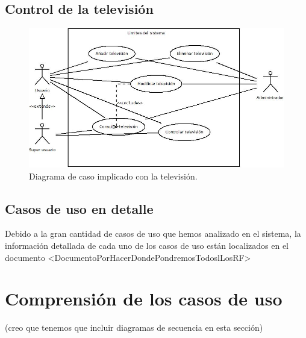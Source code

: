 \subsection{Control de la televisi\'on}
\begin{figure}
	\centering
	\includegraphics[scale=0.5]{4.Disenio/Imagenes/CasoDeUsoTelevision}
	\caption{Diagrama de caso implicado con la televisi\'on.}
\end{figure}
\subsection{Casos de uso en detalle}
Debido a la gran cantidad de casos de uso que hemos analizado en el sistema, la informaci\'on detallada de cada uno de los casos de uso est\'an localizados en el documento <DocumentoPorHacerDondePondremosTodoslLosRF>
\section{Comprensi\'on de los casos de uso}
(creo que tenemos que incluir diagramas de secuencia en esta secci\'on)